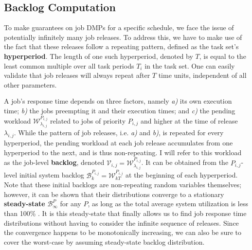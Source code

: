 \documentclass[a4paper,oneside]{csthesis}
\begin{document}
\subsection{Backlog Computation}
\label{subsec:backlog-comp}
To make guarantees on job DMPs for a specific schedule, we face the issue of potentially infinitely many job releases. To address this, we have to make use of the fact that these releases follow a repeating pattern, defined as the task set's \textbf{hyperperiod}. The length of one such hyperperiod, denoted by $T$, is equal to the least common multiple over all task periods $T_i$ in the task set. One can easily validate that job releases will always repeat after $T$ time units, independent of all other parameters.

A job's response time depends on three factors, namely \textit{a)} its own execution time; \textit{b)} the jobs preempting it and their execution times; and \textit{c)} the pending workload $\mathcal{W}_{\lambda_{i,j}}^{P_{i,j}}$ related to jobs of priority $P_{i,j}$ and higher at the time of release $\lambda_{i,j}$. While the pattern of job releases, i.e. \textit{a)} and \textit{b)}, is repeated for every hyperperiod, the pending workload at each job release accumulates from one hyperperiod to the next, and is thus non-repeating. I will refer to this workload as the job-level \textbf{backlog}, denoted $\mathcal{V}_{i,j} = \mathcal{W}_{\lambda_{i,j}}^{P_{i,j}}$. It can be obtained from the $P_{i,j}$-level initial system backlog $\mathcal{B}_k^{P_{i,j}} = \mathcal{W}_{kT}^{P_{i,j}}$ at the beginning of each hyperperiod. Note that these initial backlogs are non-repeating random variables themselves; however, it can be shown that their distributions converge to a stationary \textbf{steady-state} $\mathcal{B}_\infty^P$ for any $P$, as long as the total average system utilization is less than 100\% \cite{diaz2003stochastic}. It is this steady-state that finally allows us to find job response time distributions without having to consider the infinite sequence of releases. Since the convergence happens to be monotonically increasing, we can also be sure to cover the worst-case by assuming steady-state backlog distribution.
\end{document}

